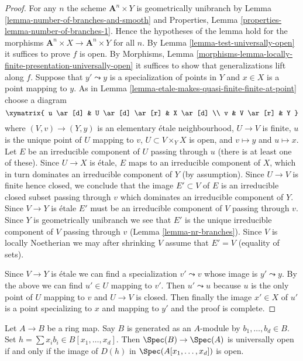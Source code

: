 \begin{proof}
For any $n$ the scheme $\mathbf{A}^n \times Y$ is geometrically unibranch
by Lemma \ref{lemma-number-of-branches-and-smooth} and
Properties, Lemma \ref{properties-lemma-number-of-branches-1}. Hence
the hypotheses of the lemma hold for the morphisms
$\mathbf{A}^n \times X \to \mathbf{A}^n \times Y$ for all $n$.
By Lemma \ref{lemma-test-universally-open}
it suffices to prove $f$ is open. By Morphisms, Lemma
\ref{morphisms-lemma-locally-finite-presentation-universally-open}
it suffices to show that generalizations lift along $f$.
Suppose that $y' \leadsto y$ is a specialization of points in
$Y$ and $x \in X$ is a point mapping to $y$.
As in Lemma \ref{lemma-etale-makes-quasi-finite-finite-at-point}
choose a diagram
$$
\xymatrix{
u \ar[d] & U \ar[d] \ar[r] & X \ar[d] \\
v & V \ar[r] & Y
}
$$
where $(V, v) \to (Y, y)$ is an elementary \'etale neighbourhood,
$U \to V$ is finite, $u$ is the unique point of $U$ mapping to $v$,
$U \subset V \times_Y X$ is open, and $v \mapsto y$ and $u \mapsto x$.
Let $E$ be an irreducible component of $U$ passing through $u$
(there is at least one of these). Since $U \to X$ is \'etale, $E$
maps to an irreducible component of $X$,
which in turn dominates an irreducible component of $Y$ (by assumption).
Since $U \to V$ is finite hence closed, we conclude that
the image $E' \subset V$ of $E$ is an irreducible closed subset
passing through $v$ which dominates an irreducible component of $Y$.
Since $V \to Y$ is \'etale $E'$ must be an irreducible component
of $V$ passing through $v$.
Since $Y$ is geometrically unibranch we see that $E'$ is the unique irreducible
component of $V$ passing through $v$ (Lemma \ref{lemma-nr-branches}).
Since $V$ is locally Noetherian we may after shrinking $V$
assume that $E' = V$ (equality of sets).

\medskip\noindent
Since $V \to Y$ is \'etale we can find a specialization
$v' \leadsto v$ whose image is $y' \leadsto y$.
By the above we can find $u' \in U$ mapping to $v'$.
Then $u' \leadsto u$ because $u$ is the only point of
$U$ mapping to $v$ and $U \to V$ is closed.
Then finally the image $x' \in X$ of $u'$ is a point
specializing to $x$ and mapping to $y'$ and the proof is complete.
\end{proof}

\begin{lemma}
\label{lemma-characterize-universally-open-finite}
Let $A \to B$ be a ring map. Say $B$ is generated as an $A$-module by
$b_1, \ldots, b_d \in B$. Set $h = \sum x_ib_i \in B[x_1, \ldots, x_d]$.
Then $\Spec(B) \to \Spec(A)$ is universally open if and only if the image of
$D(h)$ in $\Spec(A[x_1, \ldots, x_d])$ is open.
\end{lemma}

